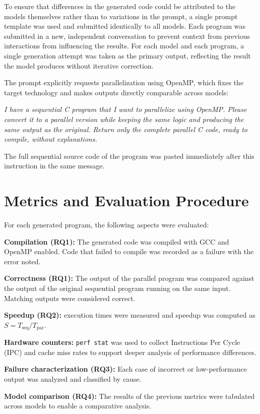 To ensure that differences in the generated code could be attributed to the models themselves rather than to variations in the prompt, a single prompt template was used and submitted identically to all models.
Each program was submitted in a new, independent conversation to prevent context from previous interactions from influencing the results.
For each model and each program, a single generation attempt was taken as the primary output, reflecting the result the model produces without iterative correction.

The prompt explicitly requests parallelization using OpenMP, which fixes the target technology and makes outputs directly comparable across models:

\begin{citacao}
\textit{I have a sequential C program that I want to parallelize using OpenMP. 
Please convert it to a parallel version while keeping the same logic and producing the same output as the original. 
Return only the complete parallel C code, ready to compile, without explanations.}
\end{citacao}

The full sequential source code of the program was pasted immediately after this instruction in the same message.

\section{Metrics and Evaluation Procedure}
\label{sec:metrics}

For each generated program, the following aspects were evaluated:

\begin{alineas}
\item \textbf{Compilation (RQ1):} The generated code was compiled with GCC and OpenMP enabled. Code that failed to compile was recorded as a failure with the error noted.
\item \textbf{Correctness (RQ1):} The output of the parallel program was compared against the output of the original sequential program running on the same input. Matching outputs were considered correct.
\item \textbf{Speedup (RQ2):} execution times were measured and speedup was computed as $S = T_{\text{seq}} / T_{\text{par}}$.
\item \textbf{Hardware counters:} \texttt{perf stat} was used to collect Instructions Per Cycle (IPC) and cache miss rates to support deeper analysis of performance differences.
\item \textbf{Failure characterization (RQ3):} Each case of incorrect or low-performance output was analyzed and classified by cause.
\item \textbf{Model comparison (RQ4):} The results of the previous metrics were tabulated across models to enable a comparative analysis.
\end{alineas}


